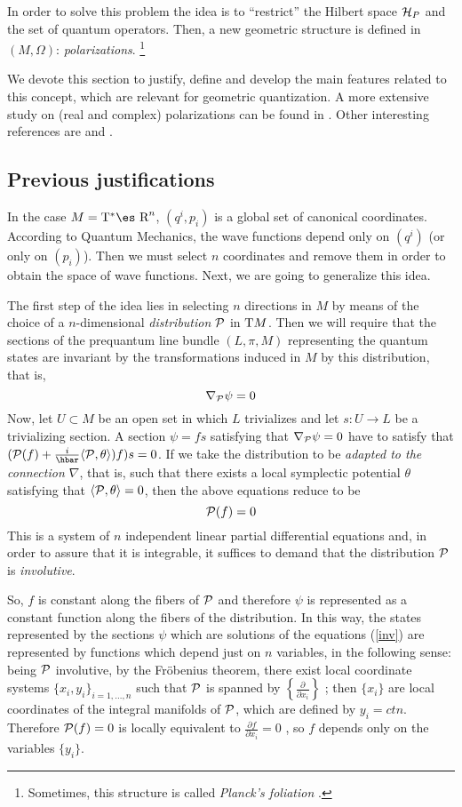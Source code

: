 \documentclass[12pt]{article}
\theoremstyle{plain}
\def\beq{\begin{equation}}
\def\eeq{\end{equation}}
\def\dst{\(}
\def\derpar#1#2{\frac{\partial{#1}}{\partial{#2}}}
\def\P{{\cal P}}
\def\H{{\cal H}}
\def\Real{\mbox{\es R}}
\def\Tan{{\rm T}}
\begin{document}
In order to solve this problem the idea is to ``restrict'' the Hilbert
space $\H_P$
and the set of quantum operators. Then, a new geometric structure is
defined in
$(M,\Omega )$: {\it polarizations}.%
\footnote{Sometimes, this structure is called {\it Planck's foliation}
\cite{AM-78}.
}

We devote this section to justify, define and develop the main features
related to this concept, which are relevant for geometric quantization.
A more extensive study on (real and complex) polarizations can be found
in \cite{Wo-80}.
Other interesting references are \cite{Sn-80} and \cite{Tu-85}.


\subsection{Previous justifications}


In the case $M=\Tan^*\Real^n$,
$(q^i,p_i)$ is a global set of canonical coordinates.
According to Quantum Mechanics, the wave functions
depend only on $(q^i)$ (or only on $(p_i)$).
Then we must select $n$ coordinates and remove them
in order to obtain the space of wave functions.
Next, we are going to generalize this idea.

The first step of the idea lies in selecting
$n$ directions in $M$ by means of the choice of a
$n$-dimensional {\it distribution} $\P$ in $\Tan M$.
Then we will require that the sections of
the prequantum line bundle $(L,\pi ,M)$ representing the quantum states
are invariant by the transformations
induced in $M$ by this distribution, that is,
\beq
\nabla_\P \psi = 0
\label{inv}
\eeq
Now, let $U \subset M$ be an open set
in which $L$ trivializes and let
$s \colon U \to L$ be a trivializing section.
A section $\psi = f s$ satisfying that
$\nabla_\P \psi = 0$
have to satisfy that
$(\P (f) + \frac{i}{\hbar}\langle \P,\theta \rangle )f)s = 0$.
If we take the distribution to be
{\it adapted to the connection $\nabla$},
that is, such that there exists
a local symplectic potential $\theta$ satisfying that
$\langle \P ,\theta \rangle = 0$,
then the above equations reduce to be
$$
\P (f) = 0
$$
This is a system of
$n$ independent linear partial differential equations and,
in order to assure that it is integrable,
it suffices to demand that the distribution $\P$
is {\it involutive}.

So, $f$ is constant along the fibers of $\P$
and therefore $\psi$ is represented as a constant function
along the fibers of the distribution.
In this way, the states represented by the sections $\psi$
which are solutions of the equations
(\ref{inv})
are represented by functions which
depend just on $n$ variables, in the following sense:
being $\P$ involutive, by the Fr\"obenius theorem,
there exist local coordinate systems
$\{ x_i,y_i \}_{i=1,\ldots ,n}$
such that $\P$ is spanned by
\dst\left\{ \derpar{}{x_i} \right\}\) ; then
$\{ x_i \}$ are local coordinates of the integral manifolds of $\P$,
which are defined by $y_i=ctn.$
Therefore $\P (f) = 0$ is locally equivalent to
 \dst\derpar{f}{x_i} = 0\) , so $f$ depends only
 on the variables $\{ y_i\}$.
\end{document}
